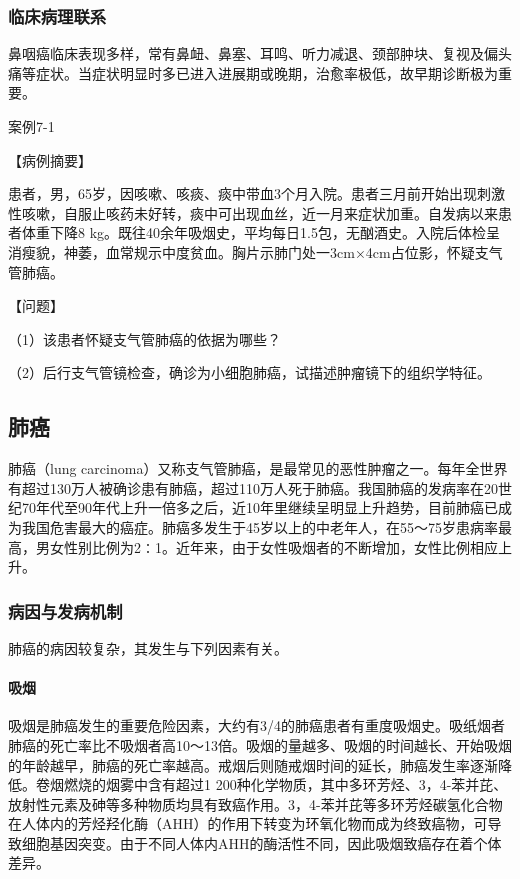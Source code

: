 \subsubsection{临床病理联系}

鼻咽癌临床表现多样，常有鼻衄、鼻塞、耳鸣、听力减退、颈部肿块、复视及偏头痛等症状。当症状明显时多已进入进展期或晚期，治愈率极低，故早期诊断极为重要。

\begin{framed}
{案例7-1}

{【病例摘要】}

患者，男，65岁，因咳嗽、咳痰、痰中带血3个月入院。患者三月前开始出现刺激性咳嗽，自服止咳药未好转，痰中可出现血丝，近一月来症状加重。自发病以来患者体重下降8
kg。既往40余年吸烟史，平均每日1.5包，无酗酒史。入院后体检呈消瘦貌，神萎，血常规示中度贫血。胸片示肺门处一3cm×4cm占位影，怀疑支气管肺癌。

{【问题】}

（1）该患者怀疑支气管肺癌的依据为哪些？

（2）后行支气管镜检查，确诊为小细胞肺癌，试描述肿瘤镜下的组织学特征。
\end{framed}

\subsection{肺癌}

肺癌（lung
carcinoma）又称支气管肺癌，是最常见的恶性肿瘤之一。每年全世界有超过130万人被确诊患有肺癌，超过110万人死于肺癌。我国肺癌的发病率在20世纪70年代至90年代上升一倍多之后，近10年里继续呈明显上升趋势，目前肺癌已成为我国危害最大的癌症。肺癌多发生于45岁以上的中老年人，在55～75岁患病率最高，男女性别比例为2∶1。近年来，由于女性吸烟者的不断增加，女性比例相应上升。

\subsubsection{病因与发病机制}

肺癌的病因较复杂，其发生与下列因素有关。

\paragraph{吸烟}
吸烟是肺癌发生的重要危险因素，大约有3/4的肺癌患者有重度吸烟史。吸纸烟者肺癌的死亡率比不吸烟者高10～13倍。吸烟的量越多、吸烟的时间越长、开始吸烟的年龄越早，肺癌的死亡率越高。戒烟后则随戒烟时间的延长，肺癌发生率逐渐降低。卷烟燃烧的烟雾中含有超过1
200种化学物质，其中多环芳烃、3，4-苯并芘、放射性元素及砷等多种物质均具有致癌作用。3，4-苯并芘等多环芳烃碳氢化合物在人体内的芳烃羟化酶（AHH）的作用下转变为环氧化物而成为终致癌物，可导致细胞基因突变。由于不同人体内AHH的酶活性不同，因此吸烟致癌存在着个体差异。

